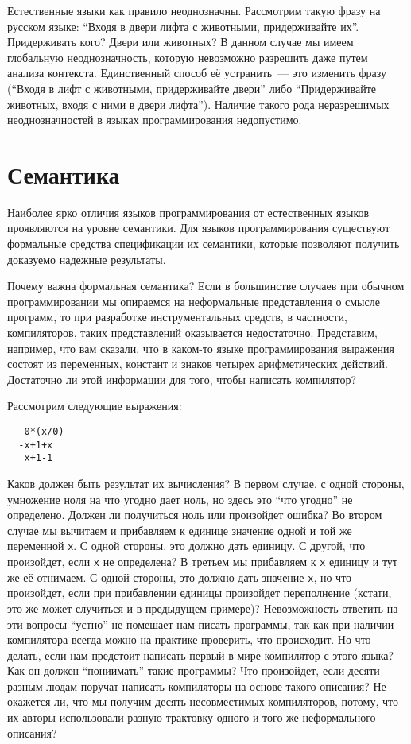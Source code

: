 \documentclass{article}
\begin{document}
Естественные языки как правило неоднозначны. Рассмотрим такую фразу на русском языке: ``Входя в двери лифта с животными, придерживайте их''. Придерживать кого? Двери или
животных? В данном случае мы имеем глобальную неоднозначность, которую невозможно разрешить даже путем анализа контекста. Единственный способ её устранить~--- это изменить фразу
(``Входя в лифт с животными, придерживайте двери'' либо ``Придерживайте животных, входя с ними в двери лифта''). Наличие такого рода неразрешимых неоднозначностей в
языках программирования недопустимо.

\section{Семантика}

Наиболее ярко отличия языков программирования от естественных языков проявляются на уровне семантики. Для языков программирования существуют формальные
средства спецификации их семантики, которые позволяют получить доказуемо надежные результаты.

Почему важна формальная семантика? Если в большинстве случаев при обычном программировании мы опираемся на неформальные представления о смысле программ,
то при разработке инструментальных средств, в частности, компиляторов, таких представлений оказывается недостаточно. Представим, например, что вам сказали,
что в каком-то языке программирования выражения состоят из переменных, констант и знаков четырех арифметических действий. Достаточно ли этой информации для
того, чтобы написать компилятор?

Рассмотрим следующие выражения:

\begin{lstlisting}
   0*(x/0)
  -x+1+x 
   x+1-1  
\end{lstlisting}      

Каков должен быть результат их вычисления? В первом случае, с одной стороны, умножение ноля на что угодно дает ноль, но здесь это ``что угодно'' не определено. Должен
ли получиться ноль или произойдет ошибка? Во втором случае мы вычитаем и прибавляем к единице значение одной и той же переменной \lstinline|x|. С одной стороны, это должно
дать единицу. С другой, что произойдет, если \lstinline|x| не определена? В третьем мы прибавляем к \lstinline|x| единицу и тут же её отнимаем. С одной стороны, это должно
дать значение \lstinline|x|, но что произойдет, если при прибавлении единицы произойдет переполнение (кстати, это же может случиться и в предыдущем примере)? Невозможность
ответить на эти вопросы ``устно'' не помешает нам писать программы, так как при наличии компилятора всегда можно на практике проверить, что происходит. Но что делать, если
нам предстоит написать первый в мире компилятор с этого языка? Как он должен ``пониимать'' такие программы? Что произойдет, если десяти разным людам поручат
написать компиляторы на основе такого описания? Не окажется ли, что мы получим десять несовместимых компиляторов, потому, что их авторы использовали разную трактовку
одного и того же неформального описания?
\end{document}
